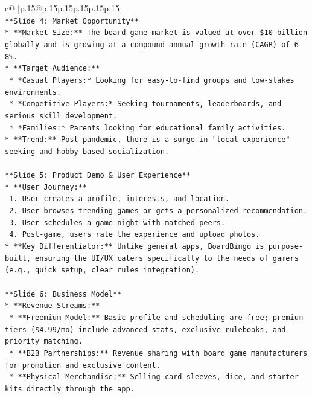 \documentclass{article}
\begin{document}
{\begin{supertabular}{c@{$\;$}|p{.15\linewidth}@{}p{.15\linewidth}p{.15\linewidth}p{.15\linewidth}p{.15\linewidth}p{.15\linewidth}}
{{{\\ 
\texttt{**Slide 4: Market Opportunity**} \\
\texttt{*   **Market Size:** The board game market is valued at over \$10 billion globally and is growing at a compound annual growth rate (CAGR) of 6{-}8\%.} \\
\texttt{*   **Target Audience:**} \\
\texttt{    *   *Casual Players:* Looking for easy{-}to{-}find groups and low{-}stakes environments.} \\
\texttt{    *   *Competitive Players:* Seeking tournaments, leaderboards, and serious skill development.} \\
\texttt{    *   *Families:* Parents looking for educational family activities.} \\
\texttt{*   **Trend:** Post{-}pandemic, there is a surge in "local experience" seeking and hobby{-}based socialization.} \\
\\ 
\texttt{**Slide 5: Product Demo \& User Experience**} \\
\texttt{*   **User Journey:**} \\
\texttt{    1.  User creates a profile, interests, and location.} \\
\texttt{    2.  User browses trending games or gets a personalized recommendation.} \\
\texttt{    3.  User schedules a game night with matched peers.} \\
\texttt{    4.  Post{-}game, users rate the experience and upload photos.} \\
\texttt{*   **Key Differentiator:** Unlike general apps, BoardBingo is purpose{-}built, ensuring the UI/UX caters specifically to the needs of gamers (e.g., quick setup, clear rules integration).} \\
\\ 
\texttt{**Slide 6: Business Model**} \\
\texttt{*   **Revenue Streams:**} \\
\texttt{    *   **Freemium Model:** Basic profile and scheduling are free; premium tiers (\$4.99/mo) include advanced stats, exclusive rulebooks, and priority matching.} \\
\texttt{    *   **B2B Partnerships:** Revenue sharing with board game manufacturers for promotion and exclusive content.} \\
\texttt{    *   **Physical Merchandise:** Selling card sleeves, dice, and starter kits directly through the app.} \\
}}}
\end{supertabular}}
\end{document}
